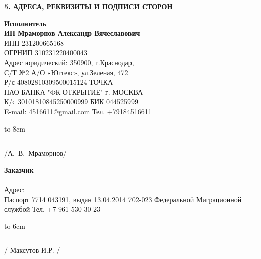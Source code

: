 \documentclass[a4paper,12pt,english,notitlepage]{report}
\begin{document}
\begin{center}
	\textbf{5. АДРЕСА, РЕКВИЗИТЫ И ПОДПИСИ СТОРОН}
\end{center}
\vspace{-6mm}
\noindent\parbox[l][5cm]{8cm}
{\begin{flushleft}
\small\textbf{Исполнитель\\ ИП Мраморнов Александр Вячеславович\\} 
\footnotesize {ИНН 231200665168\\
ОГРНИП 310231220400043}\\
\footnotesize{Адрес юридический: 350900, г.Краснодар,\\
С/Т №2 А/О «Югтекс», ул.Зеленая, 472\\
Р/с 40802810309500015124   ТОЧКА\\
ПАО БАНКА "ФК ОТКРЫТИЕ" г. МОСКВА\\
К/с 30101810845250000999 БИК   044525999\\
E-mail: 4516611@gmail.com  Тел. +79184516611 }
   	\end{flushleft}
  
\hbox to 8cm{\rule{40mm}{0.1mm} /А.~В.~Мраморнов/}}\hfill\parbox[l][5cm]{8cm}
 {
\begin{flushleft}
\small\textbf{Заказчик\\ \\} 
Адрес:\\
Паспорт 7714 043191,  выдан 13.04.2014 702-023 Федеральной Миграционной службой
Тел. +7 961 530-30-23\\ 
	\end{flushleft}
\vspace{18mm}
 	\hbox to 6cm{\rule{40mm}{0.1mm} / Максутов И.Р. /   }}
                                       
\end{document}
